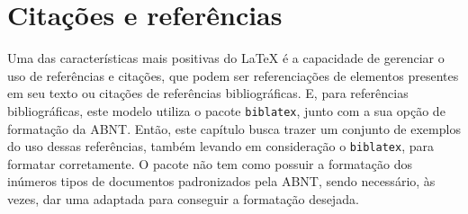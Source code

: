 \newcommand{\singlecite}[1]{%
  \defbibcheck{key#1}{
    \iffieldequalstr{entrykey}{#1}
      {}
      {\skipentry}}%
  \begin{FlushLeft}%
    \begin{singlespace}
      \setlength\bibitemsep{\baselineskip} 
      \printbibliography[heading=none,check=key#1]%
    \end{singlespace}
  \end{FlushLeft}
}%

\chapter{Citações e referências}
Uma das características mais positivas do \LaTeX{} é a capacidade de gerenciar o uso de referências e citações, que podem ser referenciações de elementos presentes em seu texto ou citações de referências bibliográficas. E, para referências bibliográficas\footnotemark, este modelo utiliza o pacote \verb|biblatex|, junto com a sua opção de formatação da ABNT. Então, este capítulo busca trazer um conjunto de exemplos do uso dessas referências, também levando em consideração o \verb|biblatex|, para formatar corretamente. O pacote não tem como possuir a formatação dos inúmeros tipos de documentos padronizados pela ABNT, sendo necessário, às vezes, dar uma adaptada para conseguir a formatação desejada.

